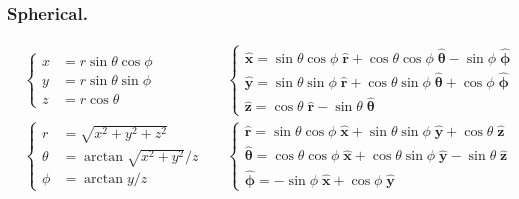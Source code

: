 \documentclass[../main.tex]{subfiles}
\begin{document}
\subsubsection{Spherical.}
\begin{align*}
   & \begin{cases}
        x &= r \sin \theta \cos \phi\\
        y &= r \sin \theta \sin \phi\\
        z & = r \cos \theta
    \end{cases}&&
    \begin{cases}
        \mathbf{\hat{x}} = \sin \theta \cos \phi \;\mathbf{\hat{r}} + \cos \theta \cos \phi \;\boldsymbol{\hat{\theta}} - \sin \phi \;\boldsymbol{\hat{\phi}}\\
        \mathbf{\hat{y}} = \sin \theta \sin \phi \;\mathbf{\hat{r}} + \cos \theta \sin \phi \;\boldsymbol{\hat{\theta}} + \cos \phi\;\boldsymbol{\hat{\phi}}\\
        \mathbf{\hat{z}} = \cos \theta\;\mathbf{\hat{r}} - \sin \theta \;\boldsymbol{\hat{\theta}}
    \end{cases}\\
   &
   \begin{cases}
        r &= \sqrt{x^2 + y^2 + z^2}\\
        \theta &=\arctan \sqrt{x^2 + y^2}/z\\
        \phi & = \arctan y/z
    \end{cases}&&
    \begin{cases} 
        \mathbf{\hat{r}} = \sin \theta \cos \phi \;\mathbf{\hat{x}} + \sin \theta \sin \phi \;\boldsymbol{\hat{y}} + \cos \theta \;\boldsymbol{\hat{z}}\\
        \boldsymbol{\hat{\theta}} = \cos \theta \cos \phi \;\mathbf{\hat{x}} + \cos \theta \sin \phi \;\boldsymbol{\hat{y}} - \sin \theta\;\boldsymbol{\hat{z}}\\
        \boldsymbol{\hat{\phi}} = -\sin \phi\;\mathbf{\hat{x}} + \cos \phi \;\boldsymbol{\hat{y}}
    \end{cases}
\end{align*}
\end{document}
